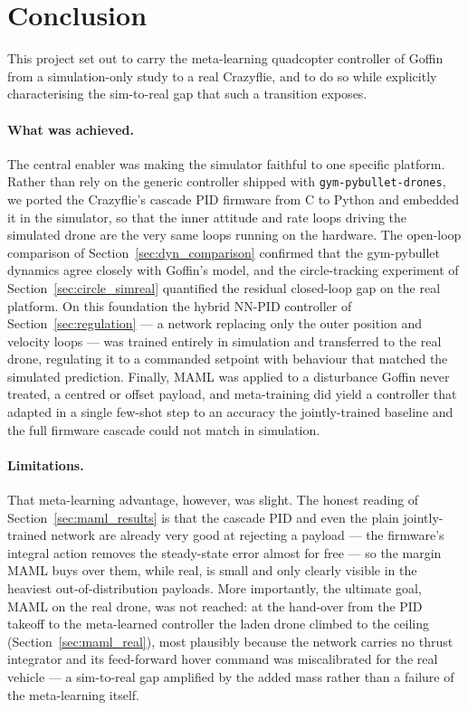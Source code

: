 \documentclass[11pt,a4paper]{article}
\theoremstyle{remark}
\numberwithin{equation}{section}
\begin{document}
\newpage
\section{Conclusion}

This project set out to carry the meta-learning quadcopter controller of
Goffin~\cite{goffin2026} from a simulation-only study to a real Crazyflie, and to
do so while explicitly characterising the sim-to-real gap that such a transition
exposes.

\paragraph{What was achieved.}
The central enabler was making the simulator faithful to one specific platform.
Rather than rely on the generic controller shipped with
\texttt{gym-pybullet-drones}, we ported the Crazyflie's cascade PID firmware from C
to Python and embedded it in the simulator, so that the inner attitude and rate
loops driving the simulated drone are the very same loops running on the hardware.
The open-loop comparison of Section~\ref{sec:dyn_comparison} confirmed that the
gym-pybullet dynamics agree closely with Goffin's model, and the circle-tracking
experiment of Section~\ref{sec:circle_simreal} quantified the residual closed-loop
gap on the real platform. On this foundation the hybrid NN-PID controller of
Section~\ref{sec:regulation} --- a network replacing only the outer position and
velocity loops --- was trained entirely in simulation and transferred to the real
drone, regulating it to a commanded setpoint with behaviour that matched the
simulated prediction. Finally, MAML was applied to a disturbance Goffin never
treated, a centred or offset payload, and meta-training did yield a controller
that adapted in a single few-shot step to an accuracy the jointly-trained baseline
and the full firmware cascade could not match in simulation.

\paragraph{Limitations.}
That meta-learning advantage, however, was slight. The honest reading of
Section~\ref{sec:maml_results} is that the cascade PID and even the plain
jointly-trained network are already very good at rejecting a payload --- the
firmware's integral action removes the steady-state error almost for free --- so
the margin MAML buys over them, while real, is small and only clearly visible in
the heaviest out-of-distribution payloads. More importantly, the ultimate goal,
MAML on the real drone, was not reached: at the hand-over from the PID takeoff to
the meta-learned controller the laden drone climbed to the ceiling
(Section~\ref{sec:maml_real}), most plausibly because the network carries no
thrust integrator and its feed-forward hover command was miscalibrated for the
real vehicle --- a sim-to-real gap amplified by the added mass rather than
a failure of the meta-learning itself.
\end{document}
